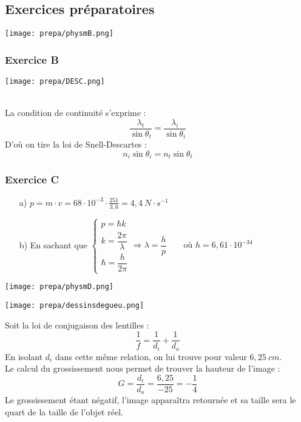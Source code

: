 \documentclass[british,french,11pt, a4paper, openany]{book}
\begin{document}
		
		\newpage
		\subsection{Exercices préparatoires}
		\begin{center}
			\texttt{[image: prepa/physmB.png]}\\
		\end{center}
		\subsubsection*{Exercice B}
		\begin{center}
			\texttt{[image: prepa/DESC.png]}
		\end{center}
		\ \\ La condition de continuité s'exprime :
		$$\frac{\lambda_t}{\sin \theta_t} = \frac{\lambda_i}{\sin \theta_i}$$
		D'où on tire la loi de Snell-Descartes :
		$$n_i \sin \theta_i = n_t \sin \theta_t$$
		
		\subsubsection*{Exercice C}
		\begin{itemize}
			\item[a)]$p=m\cdot v=68\cdot10^{-3}\cdot\frac{251}{3,6}=4,4\ N\cdot s^{-1}$
			      
			\item[b)] En sachant que $\left\{\begin{array}{l}
			      p=\hbar k  \\
			      k=\dfrac{2\pi}{\lambda}\\
			      \hbar=\dfrac{h}{2\pi}
			\end{array}\right.\Rightarrow \lambda=\dfrac{h}{p}\qquad\text{où }h=6,61\cdot 10^{-34}$
		\end{itemize}
		\begin{center}
			\texttt{[image: prepa/physmD.png]}\\
		\end{center}
		\begin{center}
			\texttt{[image: prepa/dessinsdegueu.png]}
		\end{center}
		Soit la loi de conjugaison des lentilles :
		$$\frac{1}{f} = \frac{1}{d_i} + \frac{1}{d_o}$$
		En isolant $d_i$ dans cette même relation, on lui trouve pour valeur $6,25\ cm$.\\
		
		Le calcul du grossissement nous permet de trouver la hauteur de l'image : 
		$$G = \frac{d_i}{d_o} = \frac{6,25}{-25} = -\frac{1}{4}$$
		Le grossissement étant négatif, l'image apparaîtra retournée et sa taille sera le quart de la taille de l'objet réel.
		
\end{document}
